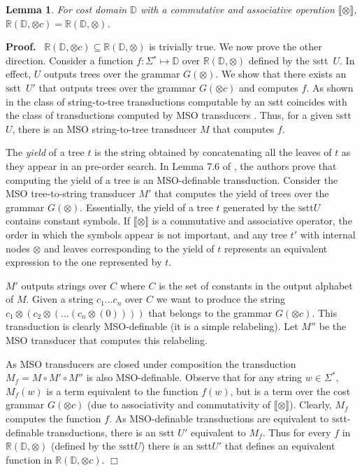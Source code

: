 \documentclass[11pt]{article}
\newtheorem{lemma}[theorem]{Lemma}
\def\Proof{{\bf Proof.}}
\def\qed{{\bf $\Box$}}
\def\qed{{\bf $\Box$}}
\newcommand{\st}{\ensuremath{^*}}
\newcommand{\domain}{\ensuremath{\mathbb{D}}}
\newcommand{\CG}{G}
\newcommand{\reg}[1]{{\mathbb R}(#1)}
\newcommand{\SSTT}{{\sc\textsc sstt}\xspace}
\newcommand{\stt}{\ensuremath{U}}
\newcommand{\fm}[1]{\ensuremath{#1^{*}}}
\newcommand{\interp}[1]{\ensuremath{\llbracket #1\rrbracket}}
\def\myplus{\otimes}
\begin{document}
\begin{lemma}
\label{ssttostt}
For cost domain $\domain$ with a commutative and associative operation
$\interp{\myplus}$,
$\reg{\domain,\myplus c}=\reg{\domain,\myplus}$.
\end{lemma}
\Proof~ $\reg{\domain,\myplus c} \subseteq \reg{\domain,\myplus}$ is
trivially true.  We now prove the other direction.  Consider a
function $f:\Sigma\st\mapsto\domain$ over $\reg{\domain,\myplus}$
defined by the \SSTT~$\stt$. In effect, $\stt$ outputs trees over the
grammar $G(\myplus)$.  We show that there exists an \SSTT~$\stt'$ that
outputs trees over the grammar $G(\myplus c)$ and computes $f$.  As
shown in \cite{alur_stt_2011} the class of string-to-tree
transductions computable by an \SSTT coincides with the class of
transductions computed by MSO transducers
\cite{engelfriet_macro2_1999}. Thus, for a given \SSTT $\stt$, there
is an MSO string-to-tree transducer $M$ that computes $f$.

The {\em yield} of a tree $t$ is the string obtained by concatenating all
the leaves of $t$ as they appear in an pre-order search.  In Lemma 7.6
of \cite{engelfriet_macro2_1999}, the authors prove that computing the
yield of a tree is an MSO-definable transduction.  Consider the MSO
tree-to-string transducer $M'$ that computes the yield of trees over
the grammar $G(\myplus)$.  Essentially, the yield of a tree $t$
generated by the \SSTT $\stt$ contains constant symbols. If
$\interp{\myplus}$
is a commutative and associative operator, the order in which the
symbols appear is not important, and any tree $t'$ with internal nodes
$\myplus$ and leaves corresponding to the yield of $t$ represents an
equivalent expression to the one represented by $t$.

$M'$ outputs strings over $C$ where $C$ is the set of constants in the
output alphabet of $M$.  Given a string $c_1\ldots c_n$ over $C$ we
want to produce the string $c_1\myplus
(c_2\myplus(\ldots(c_n\myplus(0))))$ that belongs to the grammar
$G(\myplus c)$. This transduction is clearly MSO-definable (it is a
simple relabeling). Let $M''$ be the MSO transducer that computes this
relabeling.

As MSO transducers are closed under composition
\cite{engelfriet_macro2_1999} the transduction $M_f=M\circ M'
\circ M''$ is also MSO-definable.  Observe that for any string $w
\in \fm\Sigma$, $M_f(w)$ is a term equivalent to the function $f(w)$,
but is a term over the cost grammar $\CG(\myplus c)$ (due to
associativity and commutativity of $\interp{\myplus}$).  Clearly,
$M_f$ computes the function $f$.  As MSO-definable transductions are
equivalent to \SSTT-definable transductions, there is an \SSTT
$\stt'$ equivalent to $M_f$. Thus for every $f$ in
$\reg{\domain,\myplus}$ (defined by the \SSTT $\stt$) there is an
\SSTT $\stt'$ that defines an equivalent function in
$\reg{\domain,\myplus c}$.
\qed
\end{document}

